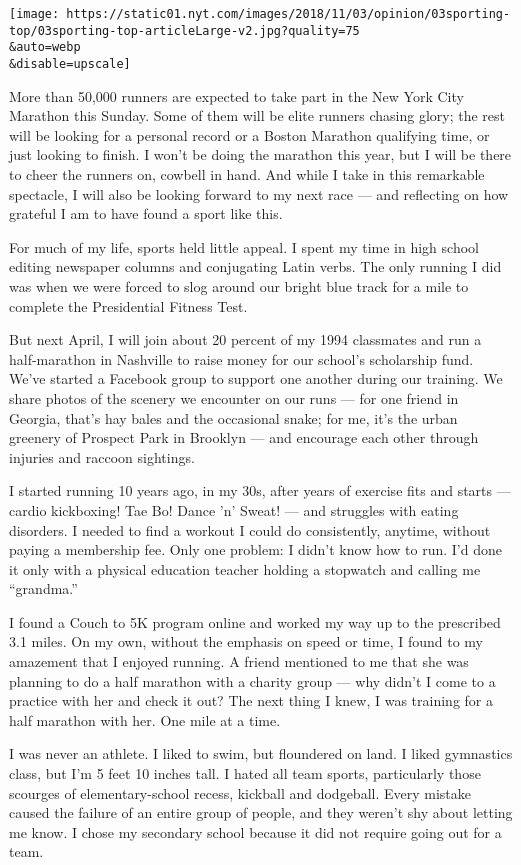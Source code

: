 \texttt{[image: https://static01.nyt.com/images/2018/11/03/opinion/03sporting-top/03sporting-top-articleLarge-v2.jpg?quality=75\\\&auto=webp\\\&disable=upscale]}

More than 50,000 runners are expected to take part in the New York City
Marathon this Sunday. Some of them will be elite runners chasing glory;
the rest will be looking for a personal record or a Boston Marathon
qualifying time, or just looking to finish. I won't be doing the
marathon this year, but I will be there to cheer the runners on, cowbell
in hand. And while I take in this remarkable spectacle, I will also be
looking forward to my next race --- and reflecting on how grateful I am
to have found a sport like this.

For much of my life, sports held little appeal. I spent my time in high
school editing newspaper columns and conjugating Latin verbs. The only
running I did was when we were forced to slog around our bright blue
track for a mile to complete the Presidential Fitness Test.

But next April, I will join about 20 percent of my 1994 classmates and
run a half-marathon in Nashville to raise money for our school's
scholarship fund. We've started a Facebook group to support one another
during our training. We share photos of the scenery we encounter on our
runs --- for one friend in Georgia, that's hay bales and the occasional
snake; for me, it's the urban greenery of Prospect Park in Brooklyn ---
and encourage each other through injuries and raccoon sightings.

I started running 10 years ago, in my 30s, after years of exercise fits
and starts --- cardio kickboxing! Tae Bo! Dance 'n' Sweat! --- and
struggles with eating disorders. I needed to find a workout I could do
consistently, anytime, without paying a membership fee. Only one
problem: I didn't know how to run. I'd done it only with a physical
education teacher holding a stopwatch and calling me ``grandma.''

I found a Couch to 5K program online and worked my way up to the
prescribed 3.1 miles. On my own, without the emphasis on speed or time,
I found to my amazement that I enjoyed running. A friend mentioned to me
that she was planning to do a half marathon with a charity group --- why
didn't I come to a practice with her and check it out? The next thing I
knew, I was training for a half marathon with her. One mile at a time.

I was never an athlete. I liked to swim, but floundered on land. I liked
gymnastics class, but I'm 5 feet 10 inches tall. I hated all team
sports, particularly those scourges of elementary-school recess,
kickball and dodgeball. Every mistake caused the failure of an entire
group of people, and they weren't shy about letting me know. I chose my
secondary school because it did not require going out for a team.

